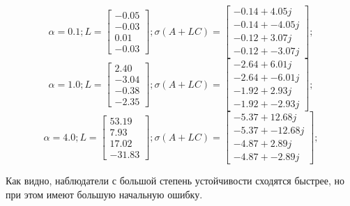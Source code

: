 \[
\alpha = 0.1; 
L = \begin{bmatrix}
 -0.05\\
 -0.03\\
  0.01\\
 -0.03
\end{bmatrix};
\sigma(A+LC) = \begin{bmatrix}
 -0.14 + 4.05j\\
 -0.14 + -4.05j\\
 -0.12 + 3.07j\\
 -0.12 + -3.07j
\end{bmatrix};
\]
\[
\alpha = 1.0; 
L = \begin{bmatrix}
  2.40\\
 -3.04\\
 -0.38\\
 -2.35
\end{bmatrix};
\sigma(A+LC) = \begin{bmatrix}
 -2.64 + 6.01j\\
 -2.64 + -6.01j\\
 -1.92 + 2.93j\\
 -1.92 + -2.93j
\end{bmatrix};
\]
\[
\alpha = 4.0; 
L = \begin{bmatrix}
  53.19\\
  7.93\\
  17.02\\
 -31.83
\end{bmatrix};
\sigma(A+LC) = \begin{bmatrix}
 -5.37 + 12.68j\\
 -5.37 + -12.68j\\
 -4.87 + 2.89j\\
 -4.87 + -2.89j
\end{bmatrix};
\]

\FloatBarrier



Как видно, наблюдатели с большой степень устойчивости сходятся быстрее, но при этом имеют большую начальную ошибку.
